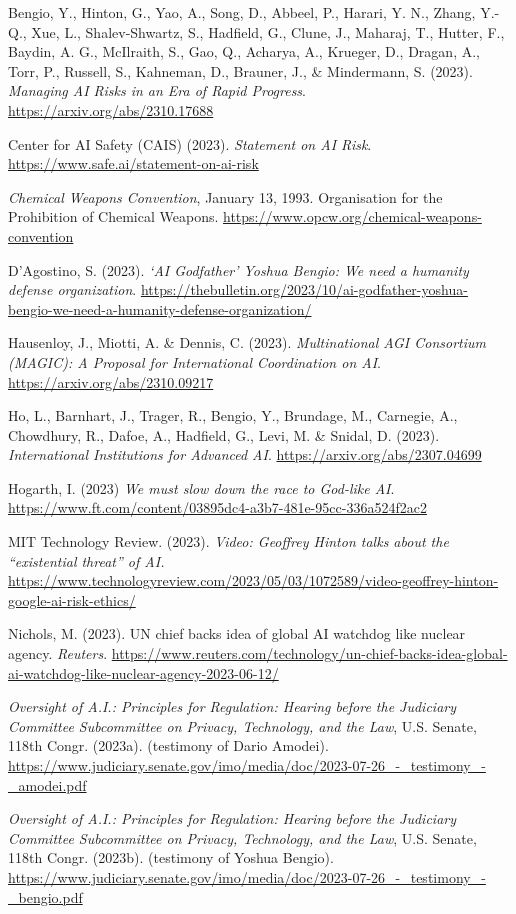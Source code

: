 \documentclass[12pt,a4paper]{article}
\begin{document}
Bengio, Y., Hinton, G., Yao, A., Song, D., Abbeel, P., Harari, Y. N., Zhang, Y.-Q., Xue, L., Shalev-Shwartz, S., Hadfield, G., Clune, J., Maharaj, T., Hutter, F., Baydin, A. G., McIlraith, S., Gao, Q., Acharya, A., Krueger, D., Dragan, A., Torr, P., Russell, S., Kahneman, D., Brauner, J., \& Mindermann, S. (2023). \textit{Managing AI Risks in an Era of Rapid Progress}. \url{https://arxiv.org/abs/2310.17688}

Center for AI Safety (CAIS) (2023). \textit{Statement on AI Risk}. \url{https://www.safe.ai/statement-on-ai-risk}

\textit{Chemical Weapons Convention}, January 13, 1993. Organisation for the Prohibition of Chemical Weapons. \url{https://www.opcw.org/chemical-weapons-convention}

D’Agostino, S. (2023). \textit{‘AI Godfather’ Yoshua Bengio: We need a humanity defense organization}. \url{https://thebulletin.org/2023/10/ai-godfather-yoshua-bengio-we-need-a-humanity-defense-organization/}

Hausenloy, J., Miotti, A. \& Dennis, C. (2023). \textit{Multinational AGI Consortium (MAGIC): A Proposal for International Coordination on AI}. \url{https://arxiv.org/abs/2310.09217}

Ho, L., Barnhart, J., Trager, R., Bengio, Y., Brundage, M., Carnegie, A., Chowdhury, R., Dafoe, A., Hadfield, G., Levi, M. \& Snidal, D. (2023). \textit{International Institutions for Advanced AI}. \url{https://arxiv.org/abs/2307.04699}

Hogarth, I. (2023) \textit{We must slow down the race to God-like AI}. \url{https://www.ft.com/content/03895dc4-a3b7-481e-95cc-336a524f2ac2}

MIT Technology Review. (2023).\textit{ Video: Geoffrey Hinton talks about the “existential threat” of AI.} \url{https://www.technologyreview.com/2023/05/03/1072589/video-geoffrey-hinton-google-ai-risk-ethics/}

Nichols, M. (2023). UN chief backs idea of global AI watchdog like nuclear agency. \textit{Reuters}. \url{https://www.reuters.com/technology/un-chief-backs-idea-global-ai-watchdog-like-nuclear-agency-2023-06-12/}

\textit{Oversight of A.I.: Principles for Regulation: Hearing before the Judiciary Committee Subcommittee on Privacy, Technology, and the Law}, U.S. Senate, 118th Congr. (2023a). (testimony of Dario Amodei). \url{https://www.judiciary.senate.gov/imo/media/doc/2023-07-26_-_testimony_-_amodei.pdf}

\textit{Oversight of A.I.: Principles for Regulation: Hearing before the Judiciary Committee Subcommittee on Privacy, Technology, and the Law}, U.S. Senate, 118th Congr. (2023b). (testimony of Yoshua Bengio). \url{https://www.judiciary.senate.gov/imo/media/doc/2023-07-26_-_testimony_-_bengio.pdf}
\end{document}
